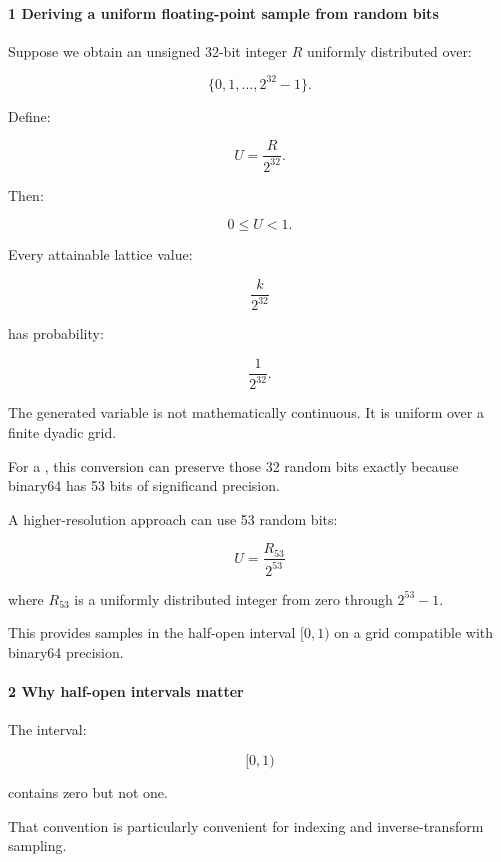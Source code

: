 \paragraph{1 Deriving a uniform floating-point sample from random bits}\label{02-foundations-ii-ch029-deriving-a-uniform-floating-point-sample-from-random-bits}

\hypertarget{02-foundations-ii-ch029-deriving-a-uniform-floating-point-sample-from-random-bits}{}

Suppose we obtain an unsigned 32-bit integer \(R\) uniformly distributed over:

\[
 \{0,1,\ldots,2^{32}-1\}.
\]

Define:

\[
 \boxed{U=\frac{R}{2^{32}}}.
\]

Then:

\[
 0\le U<1.
\]

Every attainable lattice value:

\[
 \frac{k}{2^{32}}
\]

has probability:

\[
 \frac1{2^{32}}.
\]

The generated variable is not mathematically continuous. It is uniform over a finite dyadic grid.

For a , this conversion can preserve those 32 random bits exactly because binary64 has 53 bits of significand precision.

A higher-resolution approach can use 53 random bits:

\[
 \boxed{ U=\frac{R_{53}}{2^{53}} }
\]

where \(R_{53}\) is a uniformly distributed integer from zero through \(2^{53}-1\).

This provides samples in the half-open interval \([0,1)\) on a grid compatible with binary64 precision.

\paragraph{2 Why half-open intervals matter}\label{02-foundations-ii-ch029-why-half-open-intervals-matter}

\hypertarget{02-foundations-ii-ch029-why-half-open-intervals-matter}{}

The interval:

\[
 [0,1)
\]

contains zero but not one.

That convention is particularly convenient for indexing and inverse-transform sampling.

